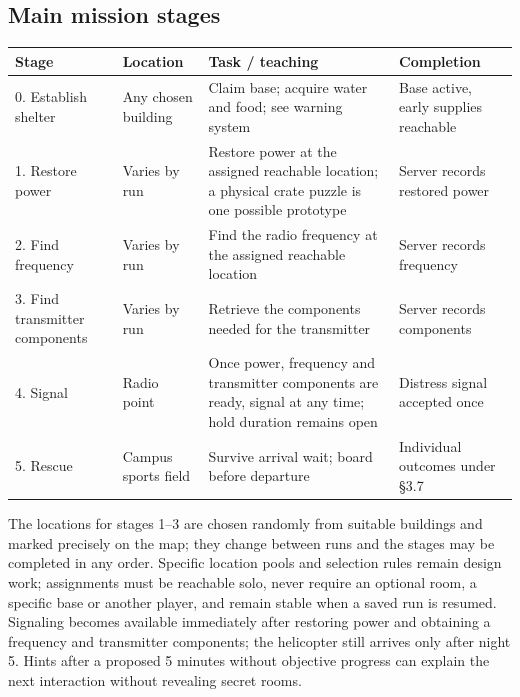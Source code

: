 \subsection{Main mission stages}
\begin{longtable}{@{}p{}p{}p{}p{}@{}}
\toprule
\textbf{Stage} & \textbf{Location} & \textbf{Task / teaching} & \textbf{Completion} \\ \midrule\endhead
0. Establish shelter & Any chosen building & Claim base; acquire water and food; see warning system & Base active, early supplies reachable \\
1. Restore power & Varies by run & Restore power at the assigned reachable location; a physical crate puzzle is one possible prototype & Server records restored power \\
2. Find frequency & Varies by run & Find the radio frequency at the assigned reachable location & Server records frequency \\
3. Find transmitter components & Varies by run & Retrieve the components needed for the transmitter & Server records components \\
4. Signal & Radio point & Once power, frequency and transmitter components are ready, signal at any time; hold duration remains open & Distress signal accepted once \\
5. Rescue & Campus sports field & Survive arrival wait; board before departure & Individual outcomes under §3.7 \\
\bottomrule
\end{longtable}
The locations for stages 1--3 are chosen randomly from suitable buildings and marked precisely on the map; they change between runs and the stages may be completed in any order. Specific location pools and selection rules remain design work; assignments must be reachable solo, never require an optional room, a specific base or another player, and remain stable when a saved run is resumed. Signaling becomes available immediately after restoring power and obtaining a frequency and transmitter components; the helicopter still arrives only after night 5. Hints after a proposed 5 minutes without objective progress can explain the next interaction without revealing secret rooms.


